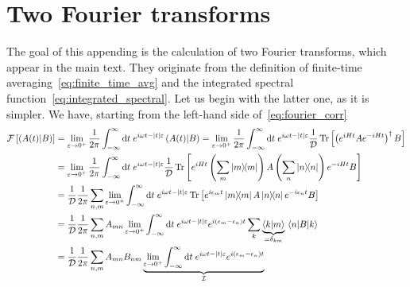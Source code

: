 \chapter{Two Fourier transforms\label{app:fourier}}
\thispagestyle{chapterBeginStyle}
The goal of this appending is the calculation of two Fourier transforms, which appear in the main text.
They originate from the definition of finite-time averaging~\eqref{eq:finite_time_avg} and
the integrated spectral function~\eqref{eq:integrated_spectral}. Let us begin with the latter one,
as it is simpler. We have, starting from the left-hand side of~\eqref{eq:fourier_corr}
\begin{align}
    \mathcal{F}\left[\hs{A(t)}{B}\right] & = \lim _{\varepsilon \to 0^+} \frac{1}{2 \pi} \int_{-\infty}^{\infty} \mathrm{d} t
    \; e^{i \omega t-|t| \varepsilon}\hs{A(t)}{B} = \lim _{\varepsilon \to 0^+} \frac{1}{2 \pi}
    \int_{-\infty}^{\infty} \mathrm{d} t \; e^{i \omega t-|t| \varepsilon} \frac{1}{\dimension}
    \Tr\left[\left(e^{iHt}Ae^{-iHt}\right)^{\dagger}B\right] \nonumber                                                                    \\
                                         & =\lim _{\varepsilon \to 0^+} \frac{1}{2 \pi}
    \int_{-\infty}^{\infty} \mathrm{d} t \; e^{i \omega t-|t| \varepsilon} \frac{1}{\dimension}
    \Tr\left[e^{iHt}\left(\sum_{m} \ketbra{m}{m}\right)
    A\left(\sum_{n} \ketbra{n}{n}\right)e^{-iHt}B\right] \nonumber                                                                        \\
                                         & = \frac{1}{\dimension} \frac{1}{2 \pi}\sum_{n,m} \lim _{\varepsilon \to 0^+}
    \int_{-\infty}^{\infty} \mathrm{d} t \; e^{i \omega t-|t| \varepsilon}
    \Tr\left[e^{i \epsilon_m t}\ketbra{m}{m} A\ketbra{n}{n}e^{-i \epsilon_n t}B\right] \nonumber                                          \\
                                         & = \frac{1}{\dimension} \frac{1}{2 \pi}\sum_{n,m} A_{mn}  \lim _{\varepsilon \to 0^+}
    \int_{-\infty}^{\infty} \mathrm{d} t \; e^{i \omega t-|t| \varepsilon}e^{i (\epsilon_m-\epsilon_n) t}
    \sum_{k} \underbrace{\braket{k}{m}}_{=\delta_{km}} \matrixel{n}{B}{k} \nonumber                                                       \\
                                         & = \frac{1}{\dimension} \frac{1}{2 \pi}\sum_{n,m} A_{mn} B_{nm}  \underbrace{\lim _{\varepsilon
        \to 0^+} \int_{-\infty}^{\infty} \mathrm{d} t \; e^{i \omega t-|t|
            \varepsilon}e^{i (\epsilon_m-\epsilon_n) t}}_{\mathcal{I}}\label{eq:spectral function simplified}
\end{align}
